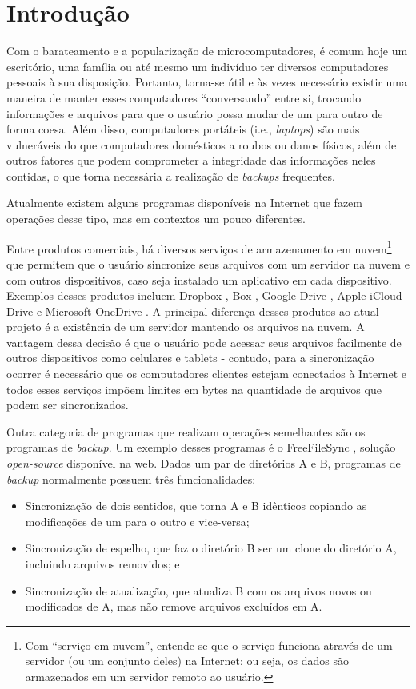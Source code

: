 \documentclass[12pt,a4paper]{ufpr}
\begin{document}
\chapter{Introdução}
\label{introducao}
Com o barateamento e a popularização de microcomputadores, é comum hoje um escritório, uma família ou até mesmo um indivíduo ter diversos computadores pessoais à sua disposição.
Portanto, torna-se útil e às vezes necessário existir uma maneira de manter esses computadores ``conversando'' entre si, trocando informações e arquivos para que o usuário possa mudar de um para outro de forma coesa.
Além disso, computadores portáteis (i.e., \textit{laptops}) são mais vulneráveis do que computadores domésticos a roubos ou danos físicos, além de outros fatores que podem comprometer a integridade das informações neles contidas, o que torna necessária a realização de \textit{backups} frequentes.

Atualmente existem alguns programas disponíveis na Internet que fazem operações desse tipo, mas em contextos um pouco diferentes.

Entre produtos comerciais, há diversos serviços de armazenamento em nuvem\footnote{Com ``serviço em nuvem'', entende-se que o serviço funciona através de um servidor (ou um conjunto deles) na Internet; ou seja, os dados são armazenados em um servidor remoto ao usuário.\cite{mell2011nist}} que permitem que o usuário sincronize seus arquivos com um servidor na nuvem e com outros dispositivos, caso seja instalado um aplicativo em cada dispositivo. 
Exemplos desses produtos incluem Dropbox \cite{dropbox}, Box \cite{box}, Google Drive \cite{googledrive}, Apple iCloud Drive \cite{icloud} e Microsoft OneDrive \cite{onedrive}.
A principal diferença desses produtos ao atual projeto é a existência de um servidor mantendo os arquivos na nuvem.
A vantagem dessa decisão é que o usuário pode acessar seus arquivos facilmente de outros dispositivos como celulares e tablets \-- contudo, para a sincronização ocorrer é necessário que os computadores clientes estejam conectados à Internet e todos esses serviços impõem limites em bytes na quantidade de arquivos que podem ser sincronizados.

Outra categoria de programas que realizam operações semelhantes são os programas de \textit{backup}.
Um exemplo desses programas é o FreeFileSync \cite{freefilesync}, solução \textit{open-source} disponível na web.
Dados um par de diretórios A e B, programas de \textit{backup} normalmente possuem três funcionalidades:
\begin{itemize}
    \item Sincronização de dois sentidos, que torna A e B idênticos copiando as modificações de um para o outro e vice-versa;
    \item Sincronização de espelho, que faz o diretório B ser um clone do diretório A, incluindo arquivos removidos; e
    \item Sincronização de atualização, que atualiza B com os arquivos novos ou modificados de A, mas não remove arquivos excluídos em A.
\end{itemize}
\end{document}
